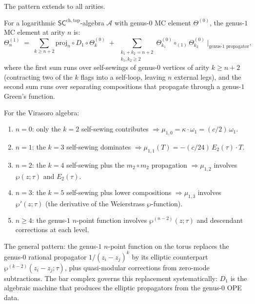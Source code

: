 \documentclass[11pt]{article}
\newcommand{\cA}{\mathcal{A}}
\newcommand{\SCchtop}{\mathsf{SC}^{\mathrm{ch,top}}}
\begin{document}
The pattern extends to all arities.

\begin{proposition}
\label{prop:wn-mu1n-general}
For a logarithmic $\SCchtop$-algebra $\cA$ with genus-$0$ MC element
$\Theta^{(0)}$, the genus-$1$ MC element at arity $n$ is:
\begin{equation}\label{eq:wn-mu1n-general}
\Theta^{(1)}_{n}
\;=\;
\sum_{k \geq n+2}
\mathrm{proj}_n \circ D_1 \circ \Theta^{(0)}_{k}
\;+\;
\sum_{\substack{k_1+k_2 = n+2 \\ k_1,k_2 \geq 2}}
\Theta^{(0)}_{k_1} \circ_{(1)} \Theta^{(0)}_{k_2}
\;\Big|_{\text{genus-}1\text{ propagator}},
\end{equation}
where the first sum runs over self-sewings of genus-$0$ vertices of
arity $k \geq n+2$ (contracting two of the $k$ flags into a self-loop,
leaving $n$ external legs), and the second sum runs over separating
compositions that propagate through a genus-$1$ Green's function.
\end{proposition}

For the Virasoro algebra:
\begin{enumerate}[label=\textup{(\alph*)}]
\item $n = 0$: only the $k = 2$ self-sewing contributes
  $\Rightarrow \mu_{1,0} = \kappa \cdot \omega_1 = (c/2)\,\omega_1$.
\item $n = 1$: the $k = 3$ self-sewing dominates
  $\Rightarrow \mu_{1,1}(T) = -(c/24)\,E_2(\tau) \cdot T$.
\item $n = 2$: the $k = 4$ self-sewing plus the $m_2 \circ m_2$
  propagation $\Rightarrow \mu_{1,2}$ involves $\wp(z;\tau)$ and
  $E_2(\tau)$.
\item $n = 3$: the $k = 5$ self-sewing plus lower compositions
  $\Rightarrow \mu_{1,3}$ involves $\wp'(z;\tau)$ (the derivative
  of the Weierstrass $\wp$-function).
\item $n \geq 4$: the genus-$1$ $n$-point function involves
  $\wp^{(n-2)}(z;\tau)$ and descendant corrections at each level.
\end{enumerate}

The general pattern: the genus-$1$ $n$-point function on the torus
replaces the genus-$0$ rational propagator $1/(z_i - z_j)^k$ by its
elliptic counterpart $\wp^{(k-2)}(z_i-z_j;\tau)$, plus quasi-modular
corrections from zero-mode subtractions.  The bar complex governs
this replacement systematically: $D_1$ is the algebraic machine that
produces the elliptic propagators from the genus-$0$ OPE data.
\end{document}
